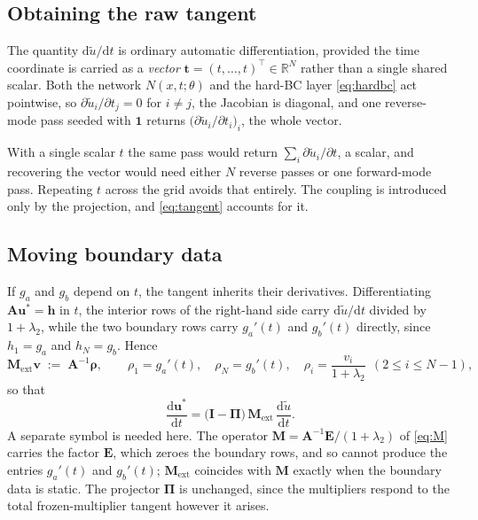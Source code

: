 \documentclass[11pt,a4paper]{article}
\theoremstyle{remark}
\newcommand{\R}{\mathbb{R}}
\newcommand{\ut}{\tilde{u}}
\newcommand{\us}{u^{*}}
\begin{document}
\subsection{Obtaining the raw tangent}

The quantity $\mathrm d\ut/\mathrm dt$ is ordinary automatic differentiation,
provided the time coordinate is carried as a \emph{vector}
$\bm t = (t,\dots,t)^\top \in \R^N$ rather than a single shared scalar. Both the
network $N(x,t;\theta)$ and the hard-BC layer \eqref{eq:hardbc} act pointwise,
so $\partial\ut_i/\partial t_j = 0$ for $i \neq j$, the Jacobian is diagonal,
and one reverse-mode pass seeded with $\bm 1$ returns
$\big(\partial\ut_i/\partial t_i\big)_i$, the whole vector.

With a single scalar $t$ the same pass would return $\sum_i \partial\ut_i/\partial t$,
a scalar, and recovering the vector would need either $N$ reverse passes or one
forward-mode pass. Repeating $t$ across the grid avoids that entirely.
The coupling is introduced only by the projection, and \eqref{eq:tangent}
accounts for it.

\subsection{Moving boundary data}

If $g_a$ and $g_b$ depend on $t$, the tangent inherits their derivatives.
Differentiating $\bm{A}\bm{\us} = \bm{h}$ in $t$, the interior rows of the
right-hand side carry $\mathrm d\ut/\mathrm dt$ divided by $1+\lambda_2$, while
the two boundary rows carry $g_a'(t)$ and $g_b'(t)$ directly, since
$h_1 = g_a$ and $h_N = g_b$. Hence
\begin{equation}
\bm{M}_{\mathrm{ext}}\bm v \;:=\; \bm{A}^{-1}\bm{\rho},
\qquad
\rho_1 = g_a'(t),\quad
\rho_N = g_b'(t),\quad
\rho_i = \frac{v_i}{1+\lambda_2}\ \ (2\le i\le N-1),
\end{equation}
so that
\begin{equation}
\frac{\mathrm d\bm{\us}}{\mathrm dt}
= \big(\bm{I}-\bm\Pi\big)\,\bm{M}_{\mathrm{ext}}\,
  \frac{\mathrm d\ut}{\mathrm dt}.
\end{equation}
A separate symbol is needed here. The operator
$\bm{M} = \bm{A}^{-1}\bm{E}/(1+\lambda_2)$ of \eqref{eq:M} carries the factor
$\bm{E}$, which zeroes the boundary rows, and so cannot produce the entries
$g_a'(t)$ and $g_b'(t)$; $\bm{M}_{\mathrm{ext}}$ coincides with $\bm{M}$ exactly
when the boundary data is static. The projector $\bm\Pi$ is unchanged, since the
multipliers respond to the total frozen-multiplier tangent however it arises.
\end{document}
